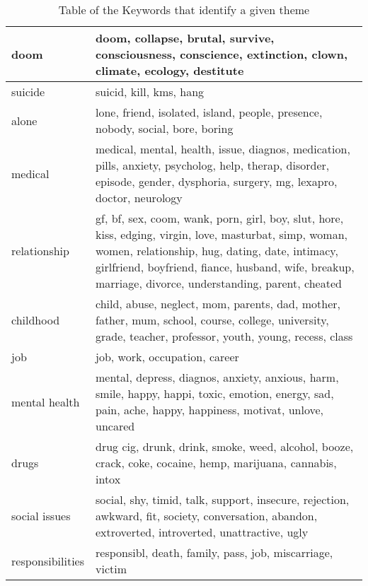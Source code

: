 \documentclass[../report.tex]{subfiles}
\begin{document}
\begin{table*}[ht]
\begin{tabular}{| l | l |}
\hline
   doom &  \multicolumn{1}{p{12cm}|}{doom, collapse, brutal, survive, consciousness, conscience, extinction, clown, climate, ecology, destitute} \\
\hline
   suicide &  \multicolumn{1}{p{12cm}|}{suicid, kill, kms, hang} \\
\hline
   alone &  \multicolumn{1}{p{12cm}|}{lone, friend, isolated, island, people, presence, nobody, social, bore, boring} \\
\hline
    medical &  \multicolumn{1}{p{12cm}|}{medical, mental, health, issue, diagnos, medication, pills, anxiety, psycholog, help, therap, disorder, episode, gender, dysphoria, surgery, mg, lexapro, doctor, neurology} \\
\hline
    relationship &  \multicolumn{1}{p{12cm}|}{gf, bf, sex, coom, wank, porn, girl, boy, slut, hore, kiss, edging, virgin, love, masturbat, simp, woman, women, relationship, hug, dating, date, intimacy, girlfriend, boyfriend, fiance, husband, wife, breakup, marriage, divorce, understanding, parent, cheated} \\
\hline
   childhood &  \multicolumn{1}{p{12cm}|}{child, abuse, neglect, mom, parents, dad, mother, father, mum, school, course, college, university, grade, teacher, professor, youth, young, recess, class} \\
\hline
   job &  \multicolumn{1}{p{12cm}|}{job, work, occupation, career } \\
\hline
   mental health &  \multicolumn{1}{p{12cm}|}{mental, depress, diagnos, anxiety, anxious, harm, smile, happy, happi, toxic, emotion, energy, sad, pain, ache, happy, happiness, motivat, unlove, uncared} \\
\hline
   drugs &  \multicolumn{1}{p{12cm}|}{drug cig, drunk, drink, smoke, weed, alcohol, booze, crack, coke, cocaine, hemp, marijuana, cannabis, intox} \\
\hline
    social issues &  \multicolumn{1}{p{12cm}|}{social, shy, timid, talk, support, insecure, rejection, awkward, fit, society, conversation, abandon, extroverted, introverted, unattractive, ugly} \\
\hline
    responsibilities &  \multicolumn{1}{p{12cm}|}{responsibl, death, family, pass, job, miscarriage, victim} \\
        \bottomrule
        \end{tabular}
        \caption{Table of the Keywords that identify a given theme}
        \label{tab:keywords}
\end{table*}
\end{document}
